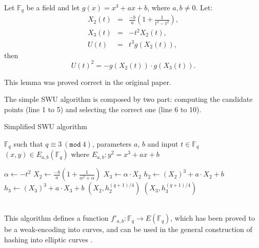 \begin{lemma}
\label{swu}
Let $\mathbb{F}_q$ be a field and let $g(x) = x^3 + ax + b$,
where $a, b \neq 0$.  Let:
\begin{equation}
\begin{array}{lll}
X_2(t) & = & \frac{-b}{a}\left(1+\frac{1}{t^4-t^2}\right),\\
X_3(t) & = & -t^2X_2(t),\\
U(t) &= & t^3g(X_2(t)),
\end{array}
\end{equation}
then 
\begin{equation}
\label{u}
U(t)^2 = -g(X_2(t))\cdot g(X_3(t)).
\end{equation}
\end{lemma}
This lemma was proved correct in the original paper.  
\renewcommand{\algorithmicrequire}{\textbf{Input:}}
\renewcommand{\algorithmicensure}{\textbf{Output:}}

The simple SWU algorithm is composed by two part: computing the candidate
points (line 1 to 5) and selecting the correct one (line 6 to 10).
\begin{algorithm} 
\caption{Simplified SWU algorithm \cite{brier2010efficient}}
\label{sswu}
  \begin{algorithmic}[1]
    \Require $\mathbb{F}_q$ such that $q \equiv 3\ (\texttt{mod}\ 4)$, parameters
$a$, $b$ and input $t \in \mathbb{F}_q$
    \Ensure $(x, y) \in E_{a,b}(\mathbb{F}_q)$ where $E_{a,b}: y^2 = x^3 + ax +
b$

    \State $\alpha \gets -t^2$
    \State $X_2 \gets \frac{-b}{a}(1+\frac{1}{\alpha^2+\alpha})$
    \State $X_3 \gets \alpha \cdot X_2$
    \State $h_2 \gets (X_2)^3 + a\cdot X_2 + b$
    \State $h_3 \gets (X_3)^3 + a\cdot X_3 + b$
      \State \Return $(X_2, h_2^{(q+1)/4})$
    \Else
      \State \Return $(X_3, h_3^{(q+1)/4})$
    \EndIf
  \end{algorithmic}
\end{algorithm}
\\This algorithm defines a function $f'_{a,b}: \mathbb{F}_{q} \rightarrow
E(\mathbb{F}_q)$, which has been proved to be a weak-encoding into curves, and can
be used in the general construction of hashing into elliptic curves \cite{brier2010efficient}.

